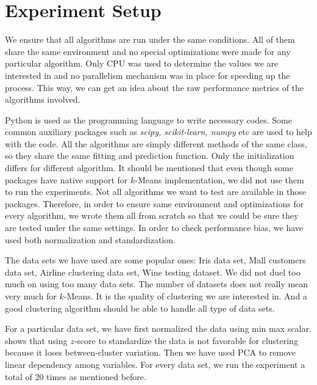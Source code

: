 \documentclass[twoside, 11pt]{article}
\begin{document}
	\section{Experiment Setup}
	We ensure that all algorithms are run under the same conditions. All of them share the same environment and no special optimizations were made for any particular algorithm. Only CPU was used to determine the values we are interested in and no parallelism mechanism was in place for speeding up the process. This way, we can get an idea about the raw performance metrics of the algorithms involved.
	
	Python is used as the programming language to write necessary codes. Some common auxiliary packages such as \textit{scipy, scikit-learn, numpy} etc are used to help with the code. All the algorithms are simply different methods of the same class, so they share the same fitting and prediction function. Only the initialization differs for different algorithm. It should be mentioned that even though some packages have native support for $k$-Means implementation, we did not use them to run the experiments. Not all algorithms we want to test are available in those packages. Therefore, in order to ensure same environment and optimizations for every algorithm, we wrote them all from scratch so that we could be sure they are tested under the same settings. In order to check performance bias, we have used both normalization and standardization.
	
	The data sets we have used are some popular ones: Iris data set, Mall customers data set, Airline clustering data set, Wine testing dataset. We did not duel too much on using too many data sets. The number of datasets does not really mean very much for $k$-Means. It is the quality of clustering we are interested in. And a good clustering algorithm should be able to handle all type of data sets.
	
	For a particular data set, we have first normalized the data using min max scalar. \cite{miligan} shows that using $z$-score to standardize the data is not favorable for clustering because it loses between-cluster variation. Then we have used PCA to remove linear dependency among variables. For every data set, we run the experiment a total of $20$ times as mentioned before.
\end{document}
